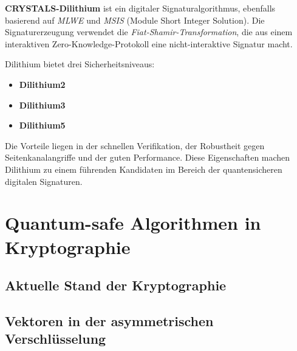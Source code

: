 \textbf{CRYSTALS-Dilithium} ist ein digitaler Signaturalgorithmus, ebenfalls basierend auf \textit{MLWE} und \textit{MSIS} (Module Short Integer Solution). Die Signaturerzeugung verwendet die \textit{Fiat-Shamir-Transformation}, die aus einem interaktiven Zero-Knowledge-Protokoll eine nicht-interaktive Signatur macht.

Dilithium bietet drei Sicherheitsniveaus:

\begin{itemize}
  \item \textbf{Dilithium2}
  \item \textbf{Dilithium3}
  \item \textbf{Dilithium5}
\end{itemize}

Die Vorteile liegen in der schnellen Verifikation, der Robustheit gegen Seitenkanalangriffe und der guten Performance. Diese Eigenschaften machen Dilithium zu einem führenden Kandidaten im Bereich der quantensicheren digitalen Signaturen.



\section{Quantum-safe Algorithmen in Kryptographie}
\subsection{Aktuelle Stand der Kryptographie}
\subsection{Vektoren in der asymmetrischen Verschlüsselung}

\printbibliography
